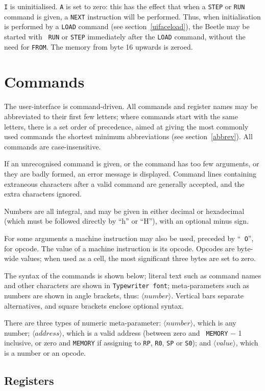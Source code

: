 \documentclass{article}
\newcommand{\angb}[1]{$\langle #1\rangle$}
\begin{document}
{\tt I} is uninitialised. {\tt A} is set to zero: this has the effect that
when a {\tt STEP} or {\tt RUN} command is given, a {\tt NEXT} instruction
will be performed. Thus, when initialisation is performed by a {\tt LOAD}
command (see section~\ref{uifaceload}), the Beetle may be started with {\tt
RUN} or {\tt STEP} immediately after the {\tt LOAD} command, without the need
for {\tt FROM}. The memory from byte 16 upwards is zeroed.


\section{Commands}
\label{commands}

The user-interface is command-driven. All commands and register names may be
abbreviated to their first few letters; where commands start with the same
letters, there is a set order of precedence, aimed at giving the most
commonly used commands the shortest minimum abbreviations (see
section~\ref{abbrev}). All commands are case-insensitive.

If an unrecognised command is given, or the command has too few arguments, or
they are badly formed, an error message is displayed. Command lines
containing extraneous characters after a valid command are generally
accepted, and the extra characters ignored.

Numbers are all integral, and may be given in either decimal or hexadecimal
(which must be followed directly by ``h'' or ``H''), with an optional minus
sign.

For some arguments a machine instruction may also be used, preceded by ``{\tt
O}'', for opcode. The value of a machine instruction is its opcode. Opcodes
are byte-wide values; when used as a cell, the most significant three bytes
are set to zero.

The syntax of the commands is shown below; literal text such as command names
and other characters are shown in {\tt Typewriter font}; meta-parameters such
as numbers are shown in angle brackets, thus: \angb{number}. Vertical bars
separate alternatives, and square brackets enclose optional syntax.

There are three types of numeric meta-parameter: \angb{number}, which is any
number; \angb{address}, which is a valid address (between zero and {\tt
MEMORY} $-$ 1 inclusive, or zero and {\tt MEMORY} if assigning to {\tt RP},
{\tt R0}, {\tt SP} or {\tt S0}); and \angb{value}, which is a number or an
opcode.

\subsection{Registers}
\end{document}
